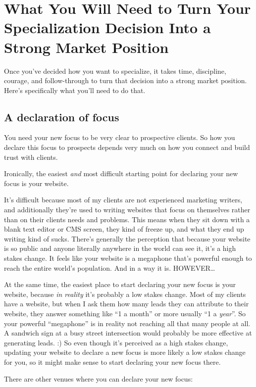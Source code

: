 \chapter{What You Will Need to Turn Your Specialization Decision Into a Strong Market Position}

Once you've decided how you want to specialize, it takes time, discipline, courage, and follow-through to turn that decision into a strong market position. Here's specifically what you'll need to do that.

\section{A declaration of focus}

You need your new focus to be very clear to prospective clients. So how you declare this focus to prospects depends very much on how you connect and build trust with clients.

Ironically, the easiest \emph{and} most difficult starting point for declaring your new focus is your website.

It's difficult because most of my clients are not experienced marketing writers, and additionally they're used to writing websites that focus on themselves rather than on their clients needs and problems. This means when they sit down with a blank text editor or CMS screen, they kind of freeze up, and what they end up writing kind of sucks. There's generally the perception that because your website is so public and anyone literally anywhere in the world can see it, it's a high stakes change. It feels like your website is a megaphone that's powerful enough to reach the entire world's population. And in a way it is. HOWEVER\ldots{}

At the same time, the easiest place to start declaring your new focus is your website, because \emph{in reality} it's probably a low stakes change. Most of my clients have a website, but when I ask them how many leads they can attribute to their website, they answer something like ``1 a month'' or more usually ``1 a \emph{year}''. So your powerful ``megaphone'' is in reality not reaching all that many people at all. A sandwich sign at a busy street intersection would probably be more effective at generating leads. :) So even though it's perceived as a high stakes change, updating your website to declare a new focus is more likely a low stakes change for you, so it might make sense to start declaring your new focus there.

There are other venues where you can declare your new focus:


